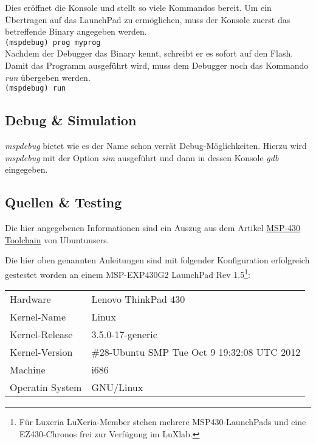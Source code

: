 \noindent
Dies eröffnet die Konsole und stellt so viele Kommandos bereit. Um ein 
Übertragen auf das LaunchPad zu ermöglichen, muss der Konsole zuerst das
betreffende Binary angegeben werden.\\

\verb?(mspdebug) prog myprog?\\

\noindent
Nachdem der Debugger das Binary kennt, schreibt er es sofort auf den Flash.
Damit das Programm ausgeführt wird, muss dem Debugger noch das Kommando 
\emph{run} übergeben werden.\\

\verb?(mspdebug) run?

\subsection{Debug \& Simulation}
\emph{mspdebug} bietet wie es der Name schon verrät Debug-Möglichkeiten.
Hierzu wird \emph{mspdebug} mit der Option \emph{sim} ausgeführt und
dann in dessen Konsole \emph{gdb} eingegeben.

\subsection{Quellen \& Testing}
Die hier angegebenen Informationen sind ein Auszug aus dem Artikel
\href{http://wiki.ubuntuusers.de/MSP430-Toolchain}{MSP-430 Toolchain} von 
Ubuntuusers. 

Die hier oben genannten Anleitungen sind mit folgender Konfiguration
erfolgreich gestestet worden an einem MSP-EXP430G2 LaunchPad Rev 1.5\footnote{
    Für Luxeria LuXeria-Member stehen mehrere MSP430-LaunchPads und eine
    EZ430-Chronos frei zur Verfügung im LuXlab.}:

\begin{table}[h!]
\centering
\begin{tabular}{ l l }
Hardware        & Lenovo ThinkPad 430 \\
Kernel-Name     & Linux \\
Kernel-Release  & 3.5.0-17-generic \\
Kernel-Version  & \#28-Ubuntu SMP Tue Oct 9 19:32:08 UTC 2012 \\
Machine         & i686 \\
Operatin System & GNU/Linux\\
\end{tabular}
\end{table}
